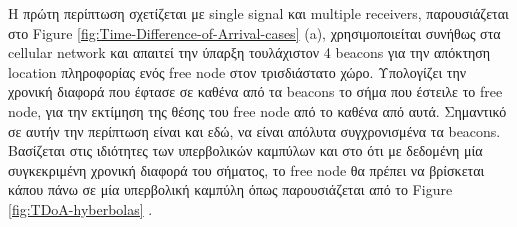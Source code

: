Η πρώτη περίπτωση σχετίζεται με single signal και multiple receivers, παρουσιάζεται στο 
Figure \ref{fig:Time-Difference-of-Arrival-cases} (a), 
χρησιμοποιείται συνήθως στα cellular network και απαιτεί την ύπαρξη 
τουλάχιστον 4 beacons για την απόκτηση location πληροφορίας ενός free node στον τρισδιάστατο χώρο. Υπολογίζει την χρονική διαφορά
που έφτασε σε καθένα από τα beacons το σήμα που έστειλε το free node, για την εκτίμηση της θέσης του free node από
το καθένα από αυτά. Σημαντικό σε αυτήν την περίπτωση είναι και εδώ, να είναι απόλυτα συγχρονισμένα τα beacons. 
Βασίζεται στις ιδιότητες των υπερβολικών καμπύλων και στο ότι με δεδομένη μία συγκεκριμένη χρονική διαφορά του σήματος, 
το free node θα πρέπει να βρίσκεται κάπου πάνω σε μία υπερβολική καμπύλη όπως παρουσιάζεται από το Figure \ref{fig:TDoA-hyberbolas}
\cite{youtube-angle-of-arrival-tdoa-hyberbolas}. 

